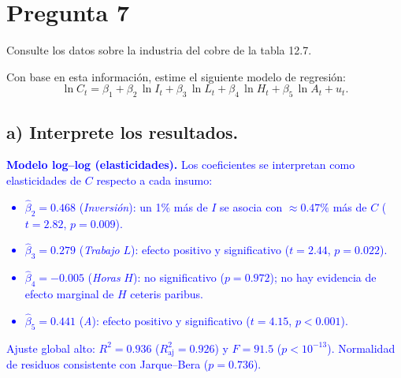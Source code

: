 \documentclass[10pt]{article}
\begin{document}
\section{Pregunta 7}
Consulte los datos sobre la industria del cobre de la tabla 12.7.

Con base en esta información, estime el siguiente modelo de regresión:
\begin{equation*}
\ln C_t 
= \beta_1 
+ \beta_2\,\ln I_t 
+ \beta_3\,\ln L_t 
+ \beta_4\,\ln H_t 
+ \beta_5\,\ln A_t 
+ u_t.
\end{equation*}

\subsection{a) Interprete los resultados.}
    \textcolor{blue}{
        \textbf{Modelo log–log (elasticidades).} Los coeficientes se interpretan como elasticidades de $C$ respecto a cada insumo:\\
        \begin{itemize}
            \item $\widehat{\beta}_2=0.468$ (\textit{Inversión}): un 1\% más de $I$ se asocia con \(\approx 0.47\%\) más de $C$ ($t=2.82$, $p=0.009$).
            \item $\widehat{\beta}_3=0.279$ (\textit{Trabajo} $L$): efecto positivo y significativo ($t=2.44$, $p=0.022$).
            \item $\widehat{\beta}_4=-0.005$ (\textit{Horas} $H$): no significativo ($p=0.972$); no hay evidencia de efecto marginal de $H$ ceteris paribus.
            \item $\widehat{\beta}_5=0.441$ (\textit{A}): efecto positivo y significativo ($t=4.15$, $p<0.001$).
        \end{itemize}
        Ajuste global alto: $R^2=0.936$ ($R^2_{\text{aj}}=0.926$) y $F=91.5$ ($p<10^{-13}$). Normalidad de residuos consistente con Jarque–Bera ($p=0.736$).\\
        
    }

    \newpage
\end{document}
